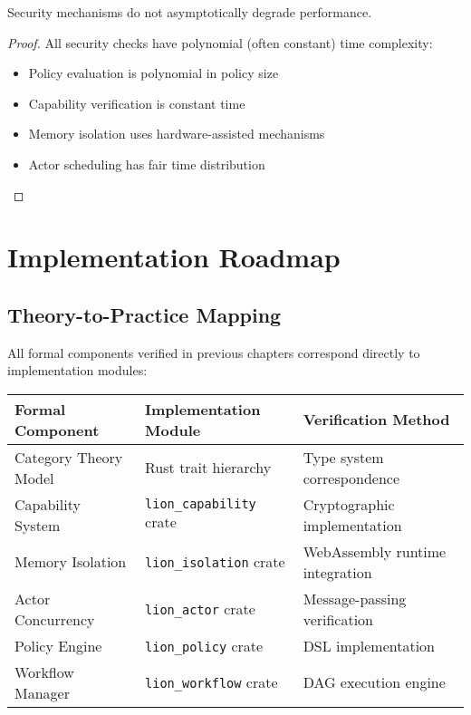 \begin{theorem}
\label{thm:performance-preservation}
Security mechanisms do not asymptotically degrade performance.
\end{theorem}

\begin{proof}
All security checks have polynomial (often constant) time complexity:
\begin{itemize}
\item Policy evaluation is polynomial in policy size
\item Capability verification is constant time
\item Memory isolation uses hardware-assisted mechanisms
\item Actor scheduling has fair time distribution
\end{itemize}
\end{proof}

\newpage

\section{Implementation Roadmap}

\subsection{Theory-to-Practice Mapping}

All formal components verified in previous chapters correspond directly to implementation modules:

\begin{center}
\begin{tabular}{@{}lll@{}}
\toprule
Formal Component & Implementation Module & Verification Method \\
\midrule
Category Theory Model & Rust trait hierarchy & Type system correspondence \\
Capability System & \texttt{lion\_capability} crate & Cryptographic implementation \\
Memory Isolation & \texttt{lion\_isolation} crate & WebAssembly runtime integration \\
Actor Concurrency & \texttt{lion\_actor} crate & Message-passing verification \\
Policy Engine & \texttt{lion\_policy} crate & DSL implementation \\
Workflow Manager & \texttt{lion\_workflow} crate & DAG execution engine \\
\bottomrule
\end{tabular}
\end{center}

